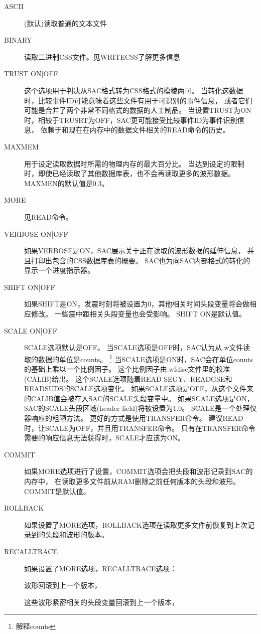 \begin{description}
\item [ASCII] (默认)读取普通的文本文件
\item [BINARY] 读取二进制CSS文件。见WRITECSS了解更多信息
\item [TRUST ON|OFF] 这个选项用于判决从SAC格式转为CSS格式的模棱两可。
    当转化这数据时，比较事件ID可能意味着这些文件有用于可识别的事件信息，
    或者它们可能是合并了两个非常不同格式的数据的人工制品。
    当设置TRUST为ON时，相较于TRUSRT为OFF，SAC更可能接受比较事件ID为事件识别信息，
    依赖于和现在在内存中的数据文件相关的READ命令的历史。%
\item [MAXMEM]用于设定读取数据时所需的物理内存的最大百分比。
    当达到设定的限制时，即使已经读取了其他数据库表，也不会再读取更多的波形数据。
    MAXMEN的默认值是0.3。
\item [MORE] 见READ命令。
\item [VERBOSE ON|OFF] 如果VERBOSE是ON，SAC展示关于正在读取的波形数据的延伸信息，
    并且打印出包含的CSS数据库表的概要。
    SAC也为向SAC内部格式的转化的显示一个进度指示器。
\item [SHIFT ON|OFF] 如果SHIFT是ON，发震时刻将被设置为0，其他相关时间头段变量将会做相应修改。
    一些震中距相关头段变量也会受影响。
    SHIFT ON是默认值。
\item [SCALE ON|OFF] SCALE选项默认是OFF。
    当SCALE选项是OFF时，SAC认为从.w文件读取的数据的单位是counts。
    \footnote{解释counts}
    当SCALE选项是ON时，SAC会在单位counts的基础上乘以一个比例因子。
    这个比例因子由.wfdisc文件里的校准(CALIB)给出。
    这个SCALE选项随着READ SEGY、READGSE和READSUDS的SCALE选项变化。
    如果SCALE选项是OFF，从这个文件来的CALIB值会被存入SAC的SCALE头段变量中。
    如果SCALE选项是ON，SAC的SCALE头段区域(header field)将被设置为1.0。
    SCALE是一个处理仪器响应的粗陋方法。
    更好的方式是使用TRANSFER命令。
    建议READ时，让SCALE为OFF，并且用TRANSFER命令。
    只有在TRANSFER命令需要的响应信息无法获得时，SCALE才应该为ON。
\item [COMMIT]如果MORE选项进行了设置，COMMIT选项会把头段和波形记录到SAC的内存中，
    在读取更多文件前从RAM删除之前任何版本的头段和波形。
    COMMIT是默认值。
\item [ROLLBACK] 如果设置了MORE选项，ROLLBACK选项在读取更多文件前恢复到上次记录到的头段和波形的版本。
\item [RECALLTRACE]如果设置了MORE选项，RECALLTRACE选项：

    波形回滚到上一个版本，

    这些波形紧密相关的头段变量回滚到上一个版本，


\end{description}
